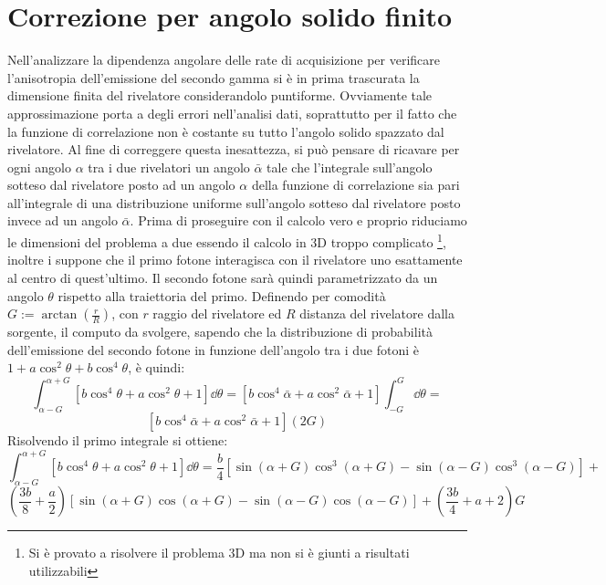 \section{Correzione per angolo solido finito}

Nell'analizzare la dipendenza angolare delle rate di acquisizione per verificare l'anisotropia dell'emissione del secondo gamma si è in prima trascurata la dimensione finita del rivelatore 
considerandolo puntiforme. Ovviamente tale approssimazione porta a degli errori nell'analisi dati, soprattutto per il fatto che la funzione di correlazione non è costante su tutto l'angolo solido
spazzato dal rivelatore. Al fine di correggere questa inesattezza, si può pensare di ricavare per ogni angolo $\alpha$ tra i due rivelatori un angolo $\bar\alpha$ tale che l'integrale sull'angolo
sotteso dal rivelatore posto ad un angolo $\alpha$ della funzione di correlazione sia pari all'integrale di una distribuzione uniforme sull'angolo sotteso dal rivelatore posto invece ad un angolo 
$\bar\alpha$. Prima di proseguire con il calcolo vero e proprio riduciamo le dimensioni del problema a due essendo il calcolo in 3D troppo complicato \footnote{
Si è provato a risolvere il problema 3D ma non si è giunti a risultati utilizzabili}, inoltre i suppone che
il primo fotone interagisca con il rivelatore uno esattamente al centro di quest'ultimo. Il secondo fotone sarà quindi parametrizzato da un angolo $\theta$ rispetto alla traiettoria
del primo. Definendo per comodità $ G := \arctan{\left(\frac{r}{R}\right)} $, con $ r $ raggio del rivelatore ed $ R $ distanza del rivelatore dalla sorgente, il computo da svolgere,
sapendo che la distribuzione di probabilità dell'emissione del secondo fotone in funzione dell'angolo tra i due fotoni è $1 + a \cos ^ 2 \theta + b \cos^4 \theta $, è quindi:
$$ \int_{\alpha -G}^{\alpha +G} \left[ b \cos^4 \theta + a \cos ^ 2  \theta + 1 \right] \dd \theta = \left[ b \cos^4 \bar\alpha + a \cos ^ 2 \bar \alpha + 1 \right] \int_{-G}^{G} \dd\theta = $$
$$ \left[ b \cos^4 \bar\alpha + a \cos ^ 2 \bar \alpha + 1 \right] \left( 2G \right) $$
Risolvendo il primo integrale si ottiene:
$$ \int_{\alpha -G}^{\alpha + G} \left[ b \cos^4 \theta + a \cos ^ 2  \theta + 1 \right] \dd \theta = 
\frac{b}{4}\left[ \sin \left( \alpha + G \right) \cos^3 \left( \alpha + G \right) - \sin \left( \alpha - G \right) \cos^3 \left( \alpha - G \right) \right] + $$
$$ \left( \frac{3b}{8} + \frac{a}{2} \right)\left[ \sin \left( \alpha + G \right) \cos \left( \alpha + G \right) - \sin \left( \alpha - G \right) \cos \left( \alpha - G \right) \right] 
+ \left( \frac{3b}{4} + a + 2 \right)G$$
